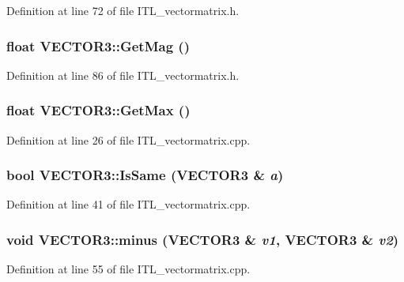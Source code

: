 Definition at line 72 of file ITL\_\-vectormatrix.h.

\hypertarget{classVECTOR3_ad0453425d5ddd7acc41e779e58292c82}{
\subsubsection[{GetMag}]{\setlength{\rightskip}{0pt plus 5cm}float VECTOR3::GetMag ()}}
\label{classVECTOR3_ad0453425d5ddd7acc41e779e58292c82}


Definition at line 86 of file ITL\_\-vectormatrix.h.

\hypertarget{classVECTOR3_ad3d4922b7faecfbf09a04e7ec63f8b97}{
\subsubsection[{GetMax}]{\setlength{\rightskip}{0pt plus 5cm}float VECTOR3::GetMax ()}}
\label{classVECTOR3_ad3d4922b7faecfbf09a04e7ec63f8b97}


Definition at line 26 of file ITL\_\-vectormatrix.cpp.

\hypertarget{classVECTOR3_a596224f61911d8e49f8a16e4de1752cd}{
\subsubsection[{IsSame}]{\setlength{\rightskip}{0pt plus 5cm}bool VECTOR3::IsSame ({\bf VECTOR3} \& {\em a})}}
\label{classVECTOR3_a596224f61911d8e49f8a16e4de1752cd}


Definition at line 41 of file ITL\_\-vectormatrix.cpp.

\hypertarget{classVECTOR3_a3540269e74f969f2d20e6907f495d852}{
\subsubsection[{minus}]{\setlength{\rightskip}{0pt plus 5cm}void VECTOR3::minus ({\bf VECTOR3} \& {\em v1}, \/  {\bf VECTOR3} \& {\em v2})}}
\label{classVECTOR3_a3540269e74f969f2d20e6907f495d852}


Definition at line 55 of file ITL\_\-vectormatrix.cpp.

